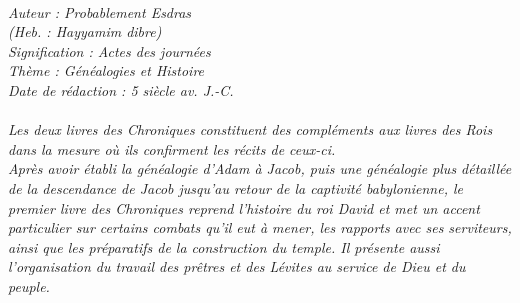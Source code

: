 \BFont
\noindent\hrulefill
{\footnotesize
\textit{
\bigskip
{\centering{}
\\Auteur : Probablement Esdras
\\(Heb. : Hayyamim dibre)
\\Signification : Actes des journées
\\Thème : Généalogies et Histoire
\\Date de rédaction : 5 siècle av. J.-C.\\}
}
\textit{
\\Les deux livres des Chroniques constituent des compléments aux livres des Rois dans la mesure où ils confirment les récits de ceux-ci.
\\Après avoir établi la généalogie d'Adam à Jacob, puis une généalogie plus détaillée de la descendance de Jacob jusqu'au retour de la captivité babylonienne, le premier livre des Chroniques reprend l'histoire du roi David et met un accent particulier sur certains combats qu'il eut à mener, les rapports avec ses serviteurs, ainsi que les préparatifs de la construction du temple. Il présente aussi l'organisation du travail des prêtres et des Lévites au service de Dieu et du peuple.\bigskip
}
}
\par\nobreak\noindent\hrulefill
